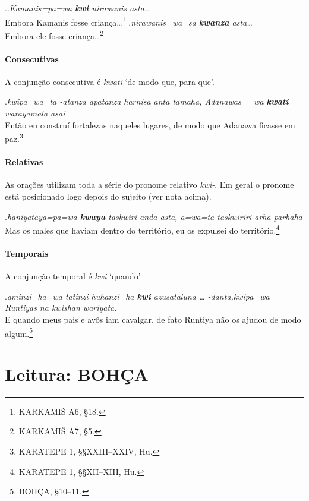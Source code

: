 \ex.\a.\emph{Kamanis=pa=wa \textbf{kwi} nirawanis asta\ldots{}}\\
Embora Kamanis fosse criança\ldots{}\footnote{KARKAMIŠ A6, §18.}
\b.\emph{nirawanis=wa=sa \textbf{kwanza} asta\ldots{}}\\
Embora ele fosse criança\ldots{}\footnote{KARKAMIŠ A7, §5.}


\paragraph{Consecutivas}
A conjunção consecutiva é \emph{kwati} `de modo que, para que'.

\ex.\emph{kwipa=wa=ta -atanza apatanza harnisa anta tamaha,
	Adanawas=\linebreak=wa
	\textbf{kwa\-ti} warayamala asai}\\
Então eu construí fortalezas naqueles lugares, de modo que Adanawa\linebreak
ficasse em paz.\footnote{KARATEPE 1, §§XXIII--XXIV, Hu.}

\paragraph{Relativas}
As orações utilizam toda a série do pronome relativo \emph{kwi-}.
Em geral o pronome está posicionado logo depois do sujeito (ver nota acima).

\ex.\emph{haniyataya=pa=wa \textbf{kwaya} taskwiri anda asta, a=wa=ta
	taskwiriri arha par\-haha}\\
Mas os males que haviam dentro do território, eu os expulsei do
território.\footnote{KARATEPE 1, §§XII--XIII, Hu.}

\paragraph{Temporais}
A conjunção temporal é \emph{kwi} `quando'

\ex.\emph{aminzi=ha=wa tatinzi huhanzi=ha \textbf{kwi} azusataluna {\ldots}
	-danta,\linebreak kwipa=wa Runtiyas na
	kwishan wariyata.}\\
E quando meus pais e avôs iam cavalgar, de fato Runtiya não
os ajudou de modo algum.\footnote{BOHÇA, §10--11.}

\clearpage



\section{Leitura: BOHÇA}


